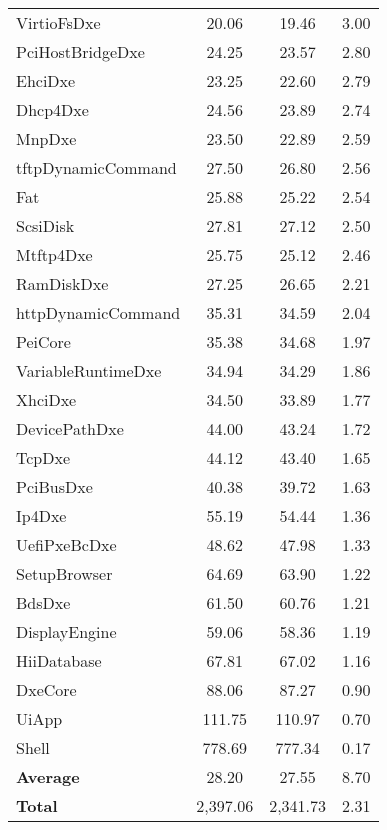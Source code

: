 \begin{longtable}{l c c c}
  VirtioFsDxe & 20.06 & 19.46 & 3.00\\
  PciHostBridgeDxe & 24.25 & 23.57 & 2.80\\
  EhciDxe & 23.25 & 22.60 & 2.79\\
  Dhcp4Dxe & 24.56 & 23.89 & 2.74\\
  MnpDxe & 23.50 & 22.89 & 2.59\\
  tftpDynamicCommand & 27.50 & 26.80 & 2.56\\
  Fat & 25.88 & 25.22 & 2.54\\
  ScsiDisk & 27.81 & 27.12 & 2.50\\
  Mtftp4Dxe & 25.75 & 25.12 & 2.46\\
  RamDiskDxe & 27.25 & 26.65 & 2.21\\
  httpDynamicCommand & 35.31 & 34.59 & 2.04\\
  PeiCore & 35.38 & 34.68 & 1.97\\
  VariableRuntimeDxe & 34.94 & 34.29 & 1.86\\
  XhciDxe & 34.50 & 33.89 & 1.77\\
  DevicePathDxe & 44.00 & 43.24 & 1.72\\
  TcpDxe & 44.12 & 43.40 & 1.65\\
  PciBusDxe & 40.38 & 39.72 & 1.63\\
  Ip4Dxe & 55.19 & 54.44 & 1.36\\
  UefiPxeBcDxe & 48.62 & 47.98 & 1.33\\
  SetupBrowser & 64.69 & 63.90 & 1.22\\
  BdsDxe & 61.50 & 60.76 & 1.21\\
  DisplayEngine & 59.06 & 58.36 & 1.19\\
  HiiDatabase & 67.81 & 67.02 & 1.16\\
  DxeCore & 88.06 & 87.27 & 0.90\\
  UiApp & 111.75 & 110.97 & 0.70\\
  Shell & 778.69 & 777.34 & 0.17\\
  \midrule
  \textbf{Average} & 28.20 & 27.55 & 8.70\\
  \textbf{Total} & 2,397.06 & 2,341.73 & 2.31\\
  \bottomrule
\end{longtable}

